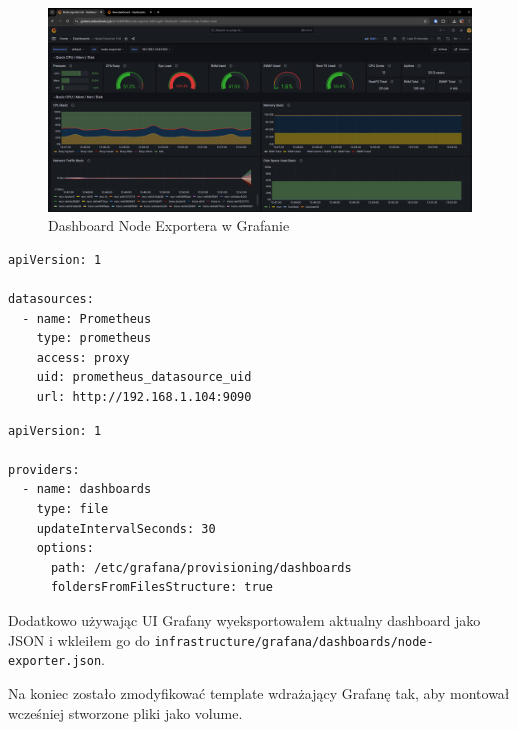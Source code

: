 \documentclass{article}
\begin{document}
\begin{figure}[H]
    \centering
    \includegraphics[width=1\linewidth]{grafanaNodeExporterDashboard.png}
    \caption{Dashboard Node Exportera w Grafanie}
    \label{fig:enter-label}
\end{figure}

\begin{lstlisting}[caption=Plik \texttt{infrastructure/grafana/datasources/datasources.yml}]
apiVersion: 1

datasources:
  - name: Prometheus
    type: prometheus
    access: proxy
    uid: prometheus_datasource_uid
    url: http://192.168.1.104:9090
\end{lstlisting}

\begin{lstlisting}[caption=Plik \texttt{infrastructure/grafana/dashboards/dashboards.yml}]
apiVersion: 1

providers:
  - name: dashboards
    type: file
    updateIntervalSeconds: 30
    options:
      path: /etc/grafana/provisioning/dashboards
      foldersFromFilesStructure: true
\end{lstlisting}

Dodatkowo używając UI Grafany wyeksportowałem aktualny dashboard jako JSON i wkleiłem go do \lstinline|infrastructure/grafana/dashboards/node-exporter.json|.

Na koniec zostało zmodyfikować template wdrażający Grafanę tak, aby montował wcześniej stworzone pliki jako volume.
\end{document}
